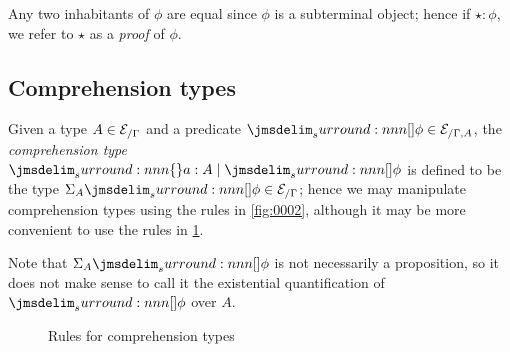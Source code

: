 \documentclass[a4paper]{article}
\begin{document}
Any two inhabitants of $\phi$ are equal since $\phi$ is a subterminal object; hence if $\star : \phi$, we refer to $\star$ as a \emph{proof} of $\phi$.

\subsection{Comprehension types}

\begin{definition}
  Given a type $A \in \mathcal{E}_{/\Gamma}$ and a predicate $\name{\phi} \in \EGammaA$, the \emph{comprehension type} $\compType{a : A}{\name{\phi}}$ is defined to be the type $\Sigma_A\name{\phi} \in \EGamma$; hence we may manipulate comprehension types using the rules in \cref{fig:0002}, although it may be more convenient to use the rules in \cref{fig:0003}.

  Note that $\Sigma_A\name{\phi}$ is not necessarily a proposition, so it does not make sense to call it the existential quantification of $\name{\phi}$ over $A$.
\end{definition}

\begin{figure}
  \centering
  \caption{Rules for comprehension types}
  \label{fig:0003}
\end{figure}



\end{document}
